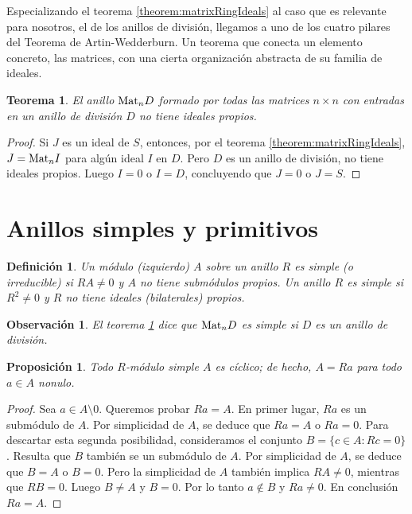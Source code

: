 \documentclass{report}
\newcommand{\Mat}{\textnormal{Mat}}
\newtheorem{theorem}{Teorema}
\newtheorem{proposition}{Proposición}
\newtheorem{definition}{Definición}
\newtheorem{remark}{Observación}
\begin{document}
  Especializando el teorema \ref{theorem:matrixRingIdeals} al caso que es relevante para nosotros, el de los anillos de división, llegamos a uno de los cuatro pilares del Teorema de Artin-Wedderburn.
  Un teorema que conecta un elemento concreto, las matrices, con una cierta organización abstracta de su familia de ideales.

  \begin{theorem}
    \label{theorem:idealsInTheRingOfMatricesOverADivisionRing}
    El anillo \(\Mat_n D\) formado por todas las matrices \(n \times n\) con entradas en un anillo de división \(D\) no tiene ideales propios.
  \end{theorem}
  \begin{proof}
    Si \(J\) es un ideal de \(S\), entonces, por el teorema \ref{theorem:matrixRingIdeals}, \(J = \Mat_n I\) para algún ideal \(I\) en \(D\).
    Pero \(D\) es un anillo de división, no tiene ideales propios.
    Luego \(I = 0\) o \(I = D\), concluyendo que \(J = 0\) o \(J = S\).
  \end{proof}

  \section{Anillos simples y primitivos}

  \begin{definition}
    Un módulo (izquierdo) \(A\) sobre un anillo \(R\) es \emph{simple} (o \emph{irreducible}) si \(R A \neq 0\) y \(A\) no tiene submódulos propios.
    Un anillo \(R\) es \emph{simple} si \(R^2 \neq 0\) y \(R\) no tiene ideales (bilaterales) propios.
  \end{definition}

  \begin{remark}
    El teorema \ref{theorem:idealsInTheRingOfMatricesOverADivisionRing} dice que \(\Mat_n D\) es simple si \(D\) es un anillo de división.
  \end{remark}

  \begin{proposition}
    \label{proposition:simpleModulesAreCiclic}
    Todo \(R\)-módulo simple \(A\) es cíclico; de hecho, \(A = R a\) para todo \(a \in A\) nonulo.
  \end{proposition}
  \begin{proof}
    Sea \(a \in A \setminus 0\).
    Queremos probar \(R a = A\).
    En primer lugar, \(R a\) es un submódulo de \(A\).
    Por simplicidad de \(A\), se deduce que \(R a = A\) o \(R a = 0\).
    Para descartar esta segunda posibilidad, consideramos el conjunto \(B = \{c \in A : R c = 0\}\).
    Resulta que \(B\) también se un submódulo de \(A\).
    Por simplicidad de \(A\), se deduce que \(B = A\) o \(B = 0\).
    Pero la simplicidad de \(A\) también implica \(R A \neq 0\), mientras que \(R B = 0\).
    Luego \(B \neq A\) y \(B = 0\).
    Por lo tanto \(a \notin B\) y \(R a \neq 0\).
    En conclusión \(R a = A\).
  \end{proof}
\end{document}
